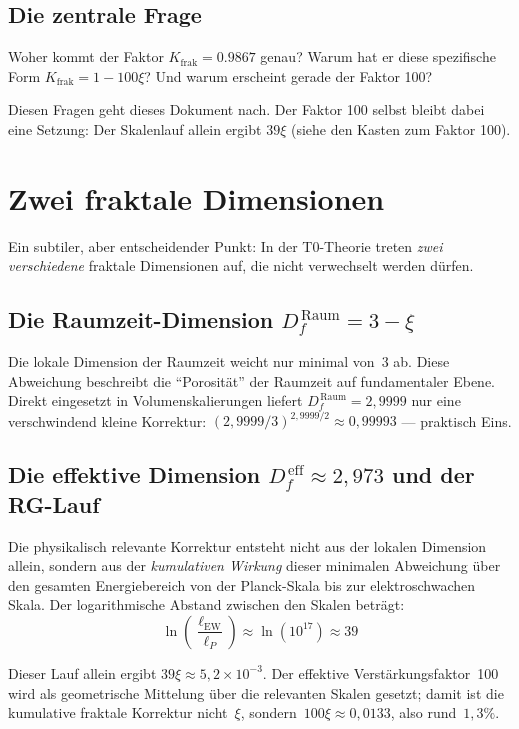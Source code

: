 	\subsection{Die zentrale Frage}
	
	Woher kommt der Faktor $K_{\text{frak}} = 0.9867$ genau? Warum hat er diese spezifische Form $K_{\text{frak}} = 1 - 100\xi$? Und warum erscheint gerade der Faktor 100?
	
	Diesen Fragen geht dieses Dokument nach. Der Faktor 100 selbst bleibt dabei eine Setzung: Der Skalenlauf allein ergibt $39\xi$ (siehe den Kasten zum Faktor 100).
	
	\section{Zwei fraktale Dimensionen}
	
	Ein subtiler, aber entscheidender Punkt: In der T0-Theorie treten \emph{zwei verschiedene} fraktale Dimensionen auf, die nicht verwechselt werden dürfen.
	
	\subsection{Die Raumzeit-Dimension $D_f^{\,\text{Raum}} = 3 - \xi$}
	
	Die lokale Dimension der Raumzeit weicht nur minimal von~3 ab. Diese Abweichung beschreibt die ``Porosität'' der Raumzeit auf fundamentaler Ebene. Direkt eingesetzt in Volumenskalierungen liefert $D_f^{\,\text{Raum}} = 2{,}9999$ nur eine verschwindend kleine Korrektur: $(2{,}9999/3)^{2{,}9999/2} \approx 0{,}99993$ --- praktisch Eins.
	
	\subsection{Die effektive Dimension $D_f^{\,\text{eff}} \approx 2{,}973$ und der RG-Lauf}
	
	Die physikalisch relevante Korrektur entsteht nicht aus der lokalen Dimension allein, sondern aus der \emph{kumulativen Wirkung} dieser minimalen Abweichung über den gesamten Energiebereich von der Planck-Skala bis zur elektroschwachen Skala. Der logarithmische Abstand zwischen den Skalen beträgt:
	\begin{equation}
		\ln\!\left(\frac{\ell_{\text{EW}}}{\ell_P}\right) \approx \ln(10^{17}) \approx 39
	\end{equation}
	
	Dieser Lauf allein ergibt $39\xi \approx 5{,}2\times10^{-3}$. Der effektive Verstärkungsfaktor~100 wird als geometrische Mittelung über die relevanten Skalen gesetzt; damit ist die kumulative fraktale Korrektur nicht~$\xi$, sondern~$100\xi \approx 0{,}0133$, also rund~$1{,}3\%$.
	
